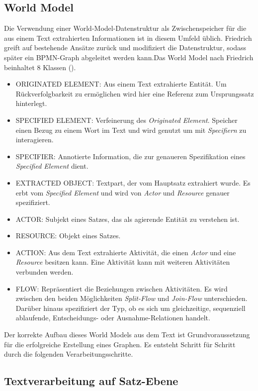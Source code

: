 \subsection{World Model}
Die Verwendung einer World-Model-Datenstruktur als Zwischenspeicher für die aus einem Text extrahierten Informationen ist in diesem Umfeld üblich. Friedrich greift auf bestehende Ansätze zurück und modifiziert die Datenstruktur, sodass später ein \ac{BPMN}-Graph abgeleitet werden kann.Das World Model nach Friedrich beinhaltet 8 Klassen (\cite[vgl.][46]{FRIEDRICH2}). 
\par
\begin{itemize} 
\item ORIGINATED ELEMENT: Aus einem Text extrahierte Entität. Um Rückverfolgbarkeit zu ermöglichen wird hier eine Referenz zum Ursprungssatz hinterlegt.
\item SPECIFIED ELEMENT: Verfeinerung des \textit{Originated Element}. Speicher einen Bezug zu einem Wort im Text und wird genutzt um mit \textit{Specifiern} zu interagieren.
\item SPECIFIER: Annotierte Information, die zur genaueren Spezifikation eines \textit{Specified Element} dient.
\item EXTRACTED OBJECT: Textpart, der vom Hauptsatz extrahiert wurde. Es erbt vom \textit{Specified Element} und wird  von \textit{Actor} und \textit{Resource} genauer spezifiziert.
\item ACTOR: Subjekt eines Satzes, das als agierende Entität zu verstehen ist. 
\item RESOURCE: Objekt eines Satzes.
\item ACTION: Aus dem Text extrahierte Aktivität, die einen \textit{Actor} und eine \textit{Resource} besitzen kann. Eine Aktivität kann mit weiteren Aktivitäten verbunden werden.
\item FLOW: Repräsentiert die Beziehungen zwischen Aktivitäten. Es wird zwischen den beiden Möglichkeiten \textit{Split-Flow} und \textit{Join-Flow} unterschieden. Darüber hinaus spezifiziert der Typ, ob es sich um gleichzeitige, sequenziell ablaufende, Entscheidungs- oder Ausnahme-Relationen handelt.
\end{itemize}

Der korrekte Aufbau dieses World Models aus dem Text ist Grundvoraussetzung für die erfolgreiche Erstellung eines Graphen. Es entsteht Schritt für Schritt durch die folgenden Verarbeitungsschritte.

\subsection{Textverarbeitung auf Satz-Ebene}

